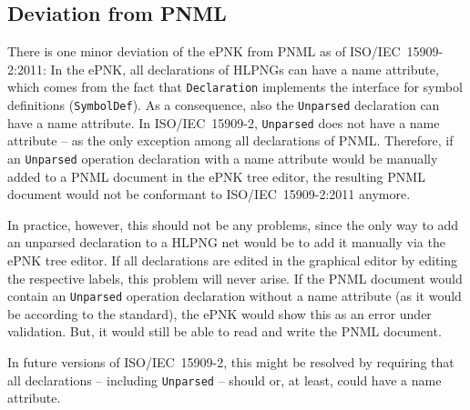 \subsection{Deviation from PNML}
\label{subsec:user-netlabels}

There is one minor deviation of the ePNK from PNML as of ISO/IEC~15909-2:2011:
In the ePNK, all declarations of HLPNGs can have a name attribute, 
which comes from the fact that {\tt Declaration} implements the interface for
symbol definitions ({\tt SymbolDef}). As a consequence, also the {\tt Unparsed}%
declaration can have a name attribute. In ISO/IEC~15909-2, {\tt Unparsed} does
not have a name attribute -- as the only exception among all declarations of
PNML. Therefore, if an {\tt Unparsed} operation declaration with a name
attribute would be manually added to a PNML document in the ePNK tree editor,
the resulting PNML document would not be conformant to  ISO/IEC~15909-2:2011 anymore.

In practice, however, this should not be any problems, since the only
way to add an unparsed declaration to a HLPNG net would be to add it manually
via the ePNK tree editor. If all declarations are edited in the graphical
editor by editing the respective labels, this problem will never arise.
If the PNML document would contain an {\tt Unparsed} operation declaration
without a name attribute (as it would be according to the standard), the
ePNK would show this as an error under validation. But, it would still be able
to read and write the PNML document.

In future versions of ISO/IEC~15909-2, this might be resolved by requiring that
all declarations -- including {\tt Unparsed} -- should or, at least, could have
a name attribute.
